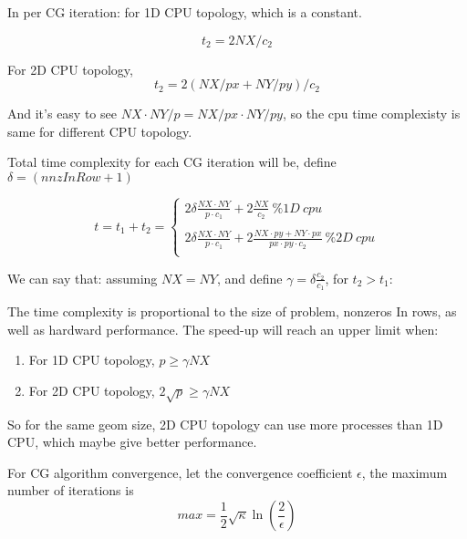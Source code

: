 \documentclass[11pt]{article}
\begin{document}
\begin{enumerate}
	In per CG iteration: for 1D CPU topology, which is a constant.
	
	\begin{equation}
	 t_2 = 2NX/c_2 
	\end{equation}

	For 2D CPU topology,
	\begin{equation}	
	t_2 = 2(NX/px + NY/py)/c_2
	\end{equation} 

 And it's easy to see $NX \cdot NY /p = NX/px \cdot NY/py$, so the cpu time complexisty is same for different CPU topology.

Total time complexity for each CG iteration will be, define $ \delta = (nnzInRow+1)$

	\[
	 t = t_1 + t_2 = \left \{
				 \begin{array}{ll}
				 2\delta \frac{NX \cdot NY}{ p \cdot c_1} + 2 \frac{NX}{c_2}  \  \% 1D \ cpu	\\
				\\
				 2\delta \frac{NX \cdot NY}{ p \cdot c_1} + 2 \frac{NX \cdot py + NY \cdot px}{px \cdot py \cdot c_2}  \ \% 2D \  cpu	\\

				  \end{array}		 
			\right.
	  \]

	
	We can say that: assuming $NX=NY$, and define $\gamma = \delta \frac{c_2}{c_1}$, for $t_2>t_1$: 
	
	The time complexity is proportional to the size of problem, nonzeros In rows, as well as hardward performance. The speed-up will reach an upper limit when:
	\begin{enumerate}
	\item{For 1D CPU topology, $p \geq \gamma  NX$ }
	\item{For 2D CPU topology,  $ 2\sqrt{p} \geq \gamma NX$ }
	\end{enumerate}

	So for the same geom size, 2D CPU topology can use more processes than 1D CPU, which maybe give better performance.
	


	For CG algorithm convergence, let the convergence coefficient $\epsilon$,  the maximum number of iterations is
	\begin{equation}
	 max = \frac{1}{2} \sqrt{\kappa} \ln{(\frac{2}{\epsilon})} 
	\end{equation}


\end{enumerate}
\end{document}

